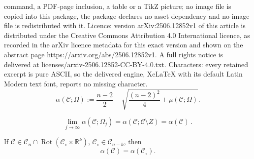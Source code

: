 \documentclass[10pt,a4paper]{amsart}
\newcommand{\RR}{\mathbb{R}}
\newcommand{\Rot}{\operatorname{Rot}}
\newcommand{\cC}{\mathcal{C}}
\begin{document}
command, a PDF-page inclusion, a table or a TikZ picture; no image file is copied into this package, the package declares no asset dependency and no image file is redistributed with it. Licence: version arXiv:2506.12852v1 of this article is distributed under the Creative Commons Attribution 4.0 International licence, as recorded in the arXiv licence metadata for this exact version and shown on the abstract page https://arxiv.org/abs/2506.12852v1. A full rights notice is delivered at licenses/arxiv-2506.12852-CC-BY-4.0.txt. Characters: every retained excerpt is pure ASCII, so the delivered engine, XeLaTeX with its default Latin Modern text font, reports no missing character.
  \begin{equation} \label{equ_alpha(Omega)}
	\alpha(\cC; \Omega) := \frac{n-2}{2} - \sqrt{\frac{(n-2)^2}{4} + \mu(\cC; \Omega)}.
  \end{equation}

  \begin{equation} \label{equ_alpha_exhaust limit}
    \lim_{j\to \infty}\alpha(\cC; \Omega_j) = \alpha(\cC; \cC\setminus Z) = \alpha(\cC)\,.       
  \end{equation}

\begin{Prop} \label{prop:kappa.spine}
	If $\cC \in \mathscr{C}_n \cap \Rot(\cC_\circ \times \RR^k)$, $\cC_\circ \in \mathscr{C}_{n-k}$, then
	\[ \alpha(\cC) = \alpha(\cC_\circ). \]
\end{Prop}
\end{document}
